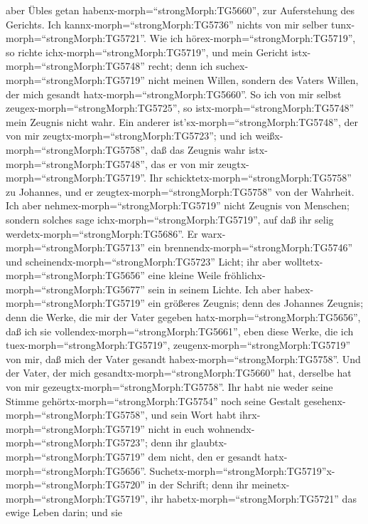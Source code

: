 aber Übles getan habenx-morph=``strongMorph:TG5660'', zur Auferstehung
des Gerichts.  Ich kannx-morph=``strongMorph:TG5736''
nichts von mir selber tunx-morph=``strongMorph:TG5721''. Wie ich
hörex-morph=``strongMorph:TG5719'', so richte
ichx-morph=``strongMorph:TG5719'', und mein Gericht
istx-morph=``strongMorph:TG5748'' recht; denn ich
suchex-morph=``strongMorph:TG5719'' nicht meinen Willen, sondern des
Vaters Willen, der mich gesandt hatx-morph=``strongMorph:TG5660''.
 So ich von mir selbst zeugex-morph=``strongMorph:TG5725'',
so istx-morph=``strongMorph:TG5748'' mein Zeugnis nicht wahr.
 Ein anderer ist'sx-morph=``strongMorph:TG5748'', der von
mir zeugtx-morph=``strongMorph:TG5723''; und ich
weißx-morph=``strongMorph:TG5758'', daß das Zeugnis wahr
istx-morph=``strongMorph:TG5748'', das er von mir
zeugtx-morph=``strongMorph:TG5719''.  Ihr
schicktetx-morph=``strongMorph:TG5758'' zu Johannes, und er
zeugtex-morph=``strongMorph:TG5758'' von der Wahrheit.  Ich
aber nehmex-morph=``strongMorph:TG5719'' nicht Zeugnis von Menschen;
sondern solches sage ichx-morph=``strongMorph:TG5719'', auf daß ihr
selig werdetx-morph=``strongMorph:TG5686''.  Er
warx-morph=``strongMorph:TG5713'' ein
brennendx-morph=``strongMorph:TG5746'' und
scheinendx-morph=``strongMorph:TG5723'' Licht; ihr aber
wolltetx-morph=``strongMorph:TG5656'' eine kleine Weile
fröhlichx-morph=``strongMorph:TG5677'' sein in seinem Lichte.
 Ich aber habex-morph=``strongMorph:TG5719'' ein größeres
Zeugnis; denn des Johannes Zeugnis; denn die Werke, die mir der Vater
gegeben hatx-morph=``strongMorph:TG5656'', daß ich sie
vollendex-morph=``strongMorph:TG5661'', eben diese Werke, die ich
tuex-morph=``strongMorph:TG5719'', zeugenx-morph=``strongMorph:TG5719''
von mir, daß mich der Vater gesandt habex-morph=``strongMorph:TG5758''.
 Und der Vater, der mich
gesandtx-morph=``strongMorph:TG5660'' hat, derselbe hat von mir
gezeugtx-morph=``strongMorph:TG5758''. Ihr habt nie weder seine Stimme
gehörtx-morph=``strongMorph:TG5754'' noch seine Gestalt
gesehenx-morph=``strongMorph:TG5758'',  und sein Wort habt
ihrx-morph=``strongMorph:TG5719'' nicht in euch
wohnendx-morph=``strongMorph:TG5723''; denn ihr
glaubtx-morph=``strongMorph:TG5719'' dem nicht, den er gesandt
hatx-morph=``strongMorph:TG5656''. 
Suchetx-morph=``strongMorph:TG5719''\textbar x-morph=``strongMorph:TG5720''
in der Schrift; denn ihr meinetx-morph=``strongMorph:TG5719'', ihr
habetx-morph=``strongMorph:TG5721'' das ewige Leben darin; und sie
